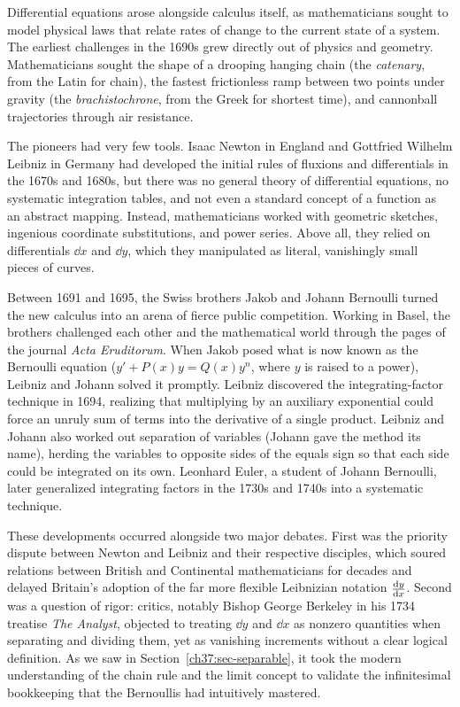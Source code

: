 \begin{historybox}
Differential equations arose alongside calculus itself, as mathematicians sought
to model physical laws that relate rates of change to the current state of a
system. The earliest
challenges in the 1690s grew directly out of physics and geometry. Mathematicians sought the
shape of a drooping hanging chain (the \emph{catenary}, from the Latin for chain),
the fastest frictionless ramp between two points
under gravity (the \emph{brachistochrone}, from the Greek for shortest time), and
cannonball trajectories through air resistance.

The pioneers had very few tools. Isaac Newton in England and Gottfried Wilhelm
Leibniz in Germany had developed the initial rules of fluxions and differentials
in the 1670s and 1680s, but there was no general theory of differential
equations, no systematic integration tables, and not even a standard concept of
a function as an abstract mapping. Instead, mathematicians worked with geometric
sketches, ingenious coordinate substitutions, and power series. Above all, they
relied on differentials $\dd x$ and $\dd y$, which they manipulated as literal,
vanishingly small pieces of curves.

Between 1691 and 1695, the Swiss brothers Jakob and Johann Bernoulli turned the
new calculus into an arena of fierce public competition. Working in Basel, the
brothers challenged each other and the mathematical world through the pages of
the journal \emph{Acta Eruditorum}. When Jakob posed what is now known as the
Bernoulli equation ($y' + P(x)y = Q(x)y^n$, where $y$ is raised to a power),
Leibniz and Johann solved it promptly. Leibniz discovered the
integrating-factor technique in 1694, realizing that multiplying by an auxiliary
exponential could force an unruly sum of terms into the derivative of a single
product. Leibniz and Johann also worked out separation of variables (Johann
gave the method its name), herding the variables to opposite sides of the
equals sign so that each side could be integrated on its own. Leonhard Euler, a student of Johann Bernoulli, later generalized
integrating factors in the 1730s and 1740s into a systematic technique.

These developments occurred alongside two major debates. First was the
priority dispute between Newton and Leibniz and their respective disciples, which
soured relations between British and Continental mathematicians for decades and
delayed Britain's adoption of the far more flexible Leibnizian notation
$\frac{\mathrm{d} y}{\mathrm{d} x}$. Second was a question of rigor: critics, notably Bishop George
Berkeley in his 1734 treatise \emph{The Analyst}, objected to treating $\dd y$
and $\dd x$ as nonzero quantities when separating and dividing them, yet as
vanishing increments without a clear logical definition. As we saw in Section~\ref{ch37:sec-separable}, it took the modern
understanding of the chain rule and the limit concept to validate the
infinitesimal bookkeeping that the Bernoullis had intuitively mastered.


\end{historybox}
